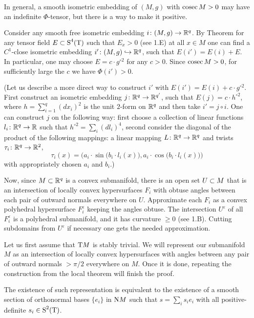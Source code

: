\documentclass{article}
\begin{document}
In general, a smooth isometric embedding of $(M,g)$ with $\mathop{\rm cosec}\nolimits M>0$
may have an indefinite $\Phi$-tensor, but there is a way to make it positive.

Consider any smooth free isometric embedding  $i\colon(M,g)\to\mathbb{R}^q$.
By
Theorem \cite[3.1.5(A)]{Grom-PDR} for any tensor field $E\subset \text{\rm S}^4(\text{\rm T})$
such that $E_x>0$ (see 1.E) at all $x\in M$
one can find a $C^1$-close isometric embedding
$i'\:(M,g)\z\hookrightarrow \RR^q$, such that $E(i')=E(i)+E$.
In particular, one may choose $E=c\cdot g^{\circ 2}$ for any $c>0$.
Since $\mathop{\rm cosec}\nolimits M>0$, for sufficiently large the $c$ we have $\Phi(i')>0$.

(Let us describe a more direct way to construct $i'$ with $E(i')=E(i)+c\cdot g^{\circ 2}$.
First construct an isometric embedding $j\colon\mathbb{R}^q\to \mathbb{R}^{q'}$,
such that
$E(j)=c\cdot h^{\circ 2}$, where $h=\sum_{i=1}^q (dx_i)^2$
is the unit $2$-form on $\mathbb{R}^q$ and then take $i'=j\circ i$.
One can construct $j$ on the following way:
first choose a collection of linear functions $l_i\colon\mathbb{R}^q\to \mathbb{R}$
such that $h^{\circ 2} = \sum_i (dl_i)^4$,
second consider the diagonal
of the product of the following mappings: a linear mapping $L\colon\mathbb{R}^q\to \mathbb{R}^q$
and twists $\tau_i\colon \mathbb{R}^q\to \mathbb{R}^2$,
\[\tau_i(x)=
\bigl(a_i\cdot  \sin \bigl(b_i\cdot l_i(x)\bigr),a_i\cdot  \cos \bigl(b_i\cdot l_i(x)\bigr)\bigr)\]
with appropriately chosen $a_i$ and $b_i$.)

Now, since $M\subset \mathbb{R}^q$ is a convex submanifold, there is an open set $U\subset M$ that is an intersection of locally convex hypersurfaces $F_i$ with obtuse angles between each pair of outward normals everywhere on $U$.
Approximate each $F_i$ as a convex polyhedral hypersurface $F_i^\varepsilon$ keeping the angles obtuse.
The intersection $U^\varepsilon$ of all $F_i^\varepsilon$ is a polyhedral submanifold,
and it has curvature $\ge 0$ (see 1.B).
Cutting subdomains from
$U^\varepsilon$ if necessary one gets the needed approximation. \qeds


 Let us first assume that
$\text{\rm T} M$ is stably trivial.
We will represent our submanifold $M$ as
an intersection of locally convex hypersurfaces with angles between any pair of outward normals $>\pi/2$
everywhere on $M$.
Once it is done, repeating the construction from the local theorem will finish the proof.

The existence of such representation is equivalent to the
existence of a smooth section of orthonormal bases $\{e_i\}$ in
$\text{\rm N}  M$ such that $s=\sum_i s_i e_i$ with all positive-definite 
$s_i\in \text{\rm S}^2(\text{\rm T})$.
\end{document}
